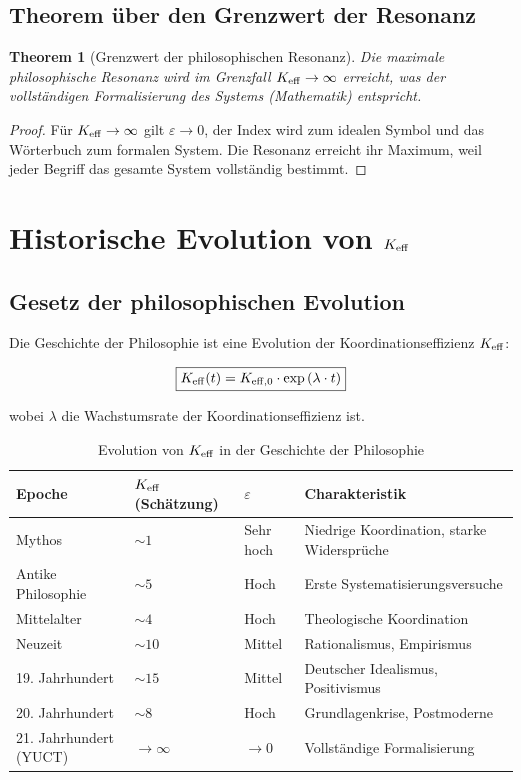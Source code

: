 \documentclass[12pt,a4paper]{article}
\newcommand{\eps}{\varepsilon}
\newtheorem{theorem}{Theorem}[section]
\begin{document}
	\subsection{Theorem über den Grenzwert der Resonanz}
	
	\begin{theorem}[Grenzwert der philosophischen Resonanz]
		Die maximale philosophische Resonanz wird im Grenzfall \(\Keff \to \infty\) erreicht, was der vollständigen Formalisierung des Systems (Mathematik) entspricht.
	\end{theorem}
	
	\begin{proof}
		Für \(\Keff \to \infty\) gilt \(\eps \to 0\), der Index wird zum idealen Symbol und das Wörterbuch zum formalen System. Die Resonanz erreicht ihr Maximum, weil jeder Begriff das gesamte System vollständig bestimmt.
	\end{proof}
	
	\section{Historische Evolution von \texorpdfstring{\(\Keff\)}{K\_eff}}
	
	\subsection{Gesetz der philosophischen Evolution}
	
	Die Geschichte der Philosophie ist eine Evolution der Koordinationseffizienz \(\Keff\):
	
	\begin{equation}
		\boxed{
			\Keff(t) = \Keff[0] \cdot \exp\left(\lambda \cdot t\right)
		}
	\end{equation}
	
	wobei \(\lambda\) die Wachstumsrate der Koordinationseffizienz ist.
	
	\begin{table}[H]
		\centering
		\caption{Evolution von \(\Keff\) in der Geschichte der Philosophie}
		\begin{tabular}{p{3cm}p{3cm}p{3cm}p{4cm}}
			\toprule
			\textbf{Epoche} & \(\Keff\) (Schätzung) & \(\eps\) & \textbf{Charakteristik} \\
			\midrule
			Mythos & \(\sim 1\) & Sehr hoch & Niedrige Koordination, starke Widersprüche \\
			Antike Philosophie & \(\sim 5\) & Hoch & Erste Systematisierungsversuche \\
			Mittelalter & \(\sim 4\) & Hoch & Theologische Koordination \\
			Neuzeit & \(\sim 10\) & Mittel & Rationalismus, Empirismus \\
			19. Jahrhundert & \(\sim 15\) & Mittel & Deutscher Idealismus, Positivismus \\
			20. Jahrhundert & \(\sim 8\) & Hoch & Grundlagenkrise, Postmoderne \\
			21. Jahrhundert (YUCT) & \(\to \infty\) & \(\to 0\) & Vollständige Formalisierung \\
			\bottomrule
		\end{tabular}
	\end{table}
	
\end{document}
